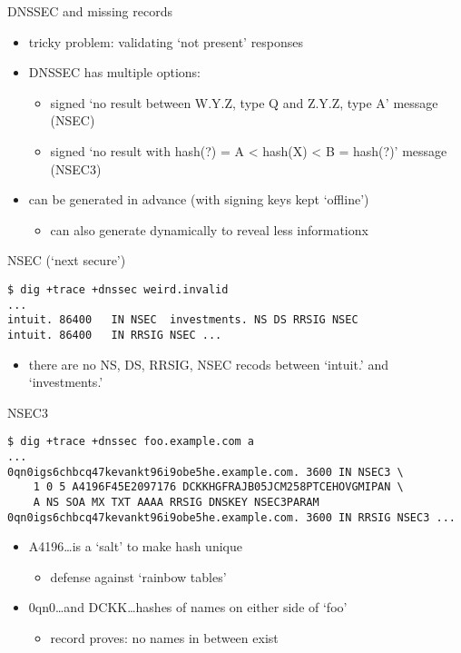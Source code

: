 
\begin{frame}{DNSSEC and missing records}
    \begin{itemize}
    \item tricky problem: validating `not present' responses
    \vspace{.5cm}
    \item DNSSEC has multiple options:
        \begin{itemize}
        \item signed `no result between W.Y.Z, type Q and Z.Y.Z, type A' message (NSEC)
        \item signed `no result with hash(?) = A < hash(X) < B = hash(?)' message (NSEC3)
        \end{itemize}
    \item can be generated in advance  (with signing keys kept `offline')
        \begin{itemize}
        \item can also generate dynamically to reveal less informationx
        \end{itemize}
    \end{itemize}
\end{frame}

\begin{frame}[fragile]{NSEC (`next secure')}
\begin{Verbatim}[fontsize=\fontsize{9}{10}]
$ dig +trace +dnssec weird.invalid
...
intuit. 86400   IN NSEC  investments. NS DS RRSIG NSEC
intuit. 86400   IN RRSIG NSEC ...
\end{Verbatim}
\begin{itemize}
\item there are no NS, DS, RRSIG, NSEC recods between `intuit.' and `investments.'
\end{itemize}
\end{frame}

\begin{frame}[fragile]{NSEC3}
\begin{Verbatim}[fontsize=\fontsize{9}{10}]
$ dig +trace +dnssec foo.example.com a
...
0qn0igs6chbcq47kevankt96i9obe5he.example.com. 3600 IN NSEC3 \
    1 0 5 A4196F45E2097176 DCKKHGFRAJB05JCM258PTCEHOVGMIPAN \
    A NS SOA MX TXT AAAA RRSIG DNSKEY NSEC3PARAM
0qn0igs6chbcq47kevankt96i9obe5he.example.com. 3600 IN RRSIG NSEC3 ...
\end{Verbatim}
\begin{itemize}
\item A4196\ldots is a `salt' to make hash unique
    \begin{itemize}
    \item defense against `rainbow tables'
    \end{itemize}
\item 0qn0\ldots and DCKK\ldots hashes of names on either side of `foo'
    \begin{itemize}
    \item record proves: no names in between exist
    \end{itemize}
\end{itemize}
\end{frame}
